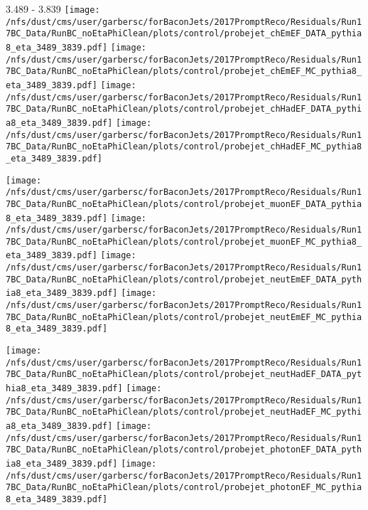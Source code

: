 \documentclass[t,compress]{beamer}
\begin{document}
\begin{frame}{3.489 - 3.839}
	\texttt{[image: /nfs/dust/cms/user/garbersc/forBaconJets/2017PromptReco/Residuals/Run17BC\_Data/RunBC\_noEtaPhiClean/plots/control/probejet\_chEmEF\_DATA\_pythia8\_eta\_3489\_3839.pdf]}
	\texttt{[image: /nfs/dust/cms/user/garbersc/forBaconJets/2017PromptReco/Residuals/Run17BC\_Data/RunBC\_noEtaPhiClean/plots/control/probejet\_chEmEF\_MC\_pythia8\_eta\_3489\_3839.pdf]}
	\texttt{[image: /nfs/dust/cms/user/garbersc/forBaconJets/2017PromptReco/Residuals/Run17BC\_Data/RunBC\_noEtaPhiClean/plots/control/probejet\_chHadEF\_DATA\_pythia8\_eta\_3489\_3839.pdf]}
	\texttt{[image: /nfs/dust/cms/user/garbersc/forBaconJets/2017PromptReco/Residuals/Run17BC\_Data/RunBC\_noEtaPhiClean/plots/control/probejet\_chHadEF\_MC\_pythia8\_eta\_3489\_3839.pdf]}
\newline

\vspace{-0.65cm}
	\texttt{[image: /nfs/dust/cms/user/garbersc/forBaconJets/2017PromptReco/Residuals/Run17BC\_Data/RunBC\_noEtaPhiClean/plots/control/probejet\_muonEF\_DATA\_pythia8\_eta\_3489\_3839.pdf]}
	\texttt{[image: /nfs/dust/cms/user/garbersc/forBaconJets/2017PromptReco/Residuals/Run17BC\_Data/RunBC\_noEtaPhiClean/plots/control/probejet\_muonEF\_MC\_pythia8\_eta\_3489\_3839.pdf]}
	\texttt{[image: /nfs/dust/cms/user/garbersc/forBaconJets/2017PromptReco/Residuals/Run17BC\_Data/RunBC\_noEtaPhiClean/plots/control/probejet\_neutEmEF\_DATA\_pythia8\_eta\_3489\_3839.pdf]}
	\texttt{[image: /nfs/dust/cms/user/garbersc/forBaconJets/2017PromptReco/Residuals/Run17BC\_Data/RunBC\_noEtaPhiClean/plots/control/probejet\_neutEmEF\_MC\_pythia8\_eta\_3489\_3839.pdf]}
\newline

\vspace{-0.65cm}
	\texttt{[image: /nfs/dust/cms/user/garbersc/forBaconJets/2017PromptReco/Residuals/Run17BC\_Data/RunBC\_noEtaPhiClean/plots/control/probejet\_neutHadEF\_DATA\_pythia8\_eta\_3489\_3839.pdf]}
	\texttt{[image: /nfs/dust/cms/user/garbersc/forBaconJets/2017PromptReco/Residuals/Run17BC\_Data/RunBC\_noEtaPhiClean/plots/control/probejet\_neutHadEF\_MC\_pythia8\_eta\_3489\_3839.pdf]}
	\texttt{[image: /nfs/dust/cms/user/garbersc/forBaconJets/2017PromptReco/Residuals/Run17BC\_Data/RunBC\_noEtaPhiClean/plots/control/probejet\_photonEF\_DATA\_pythia8\_eta\_3489\_3839.pdf]}
	\texttt{[image: /nfs/dust/cms/user/garbersc/forBaconJets/2017PromptReco/Residuals/Run17BC\_Data/RunBC\_noEtaPhiClean/plots/control/probejet\_photonEF\_MC\_pythia8\_eta\_3489\_3839.pdf]}
\end{frame}
\end{document}
